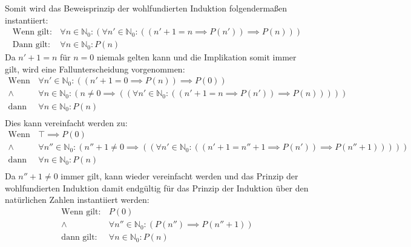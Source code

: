 					Somit wird das Beweisprinzip der wohlfundierten Induktion folgendermaßen instantiiert:
					\begin{align*}
						\text{Wenn gilt:} & \,\forall n \in \mathbb{N} _ 0 : (\forall n' \in \mathbb{N} _ 0 : ((n' + 1 = n \implies P(n')) \implies P(n))) \\
						\text{Dann gilt:} & \,\forall n \in \mathbb{N} _ 0 : P(n)
					\end{align*}
					Da $ n' + 1 = n $ für $ n = 0 $ niemals gelten kann und die Implikation somit immer gilt, wird eine Fallunterscheidung vorgenommen:
					\begin{align*}
						\text{Wenn gilt:} & \,\forall n' \in \mathbb{N} _ 0 : ((n' + 1 = 0 \implies P(n)) \implies P(0))                                                         \\
						\land             & \,\forall n \in \mathbb{N} _ 0 : (n \neq 0 \implies ((\forall n' \in \mathbb{N} _ 0 : ((n' + 1 = n \implies P(n')) \implies P(n))))) \\
						\text{dann gilt:} & \,\forall n \in \mathbb{N} _ 0 : P(n)                                                                                                \\
					\end{align*}
					Dies kann vereinfacht werden zu:
					\begin{align*}
						\text{Wenn gilt:} & \,\top \implies P(0)                                                                                                                                     \\
						\land             & \,\forall n'' \in \mathbb{N} _ 0 : (n'' + 1 \neq 0 \implies ((\forall n' \in \mathbb{N} _ 0 : ((n' + 1 = n'' + 1 \implies P(n')) \implies P(n'' + 1))))) \\
						\text{dann gilt:} & \,\forall n \in \mathbb{N} _ 0 : P(n)                                                                                                                    \\
					\end{align*}
					Da $ n'' + 1 \neq 0 $ immer gilt, kann wieder vereinfacht werden und das Prinzip der wohlfundierten Induktion damit endgültig für das Prinzip der Induktion über den natürlichen Zahlen instantiiert werden:
					\begin{align*}
						\text{Wenn gilt:} & \,P(0)                                                          \\
						\land             & \,\forall n'' \in \mathbb{N} _ 0 : (P(n'') \implies P(n'' + 1)) \\
						\text{dann gilt:} & \,\forall n \in \mathbb{N} _ 0 : P(n)                           \\
					\end{align*}

